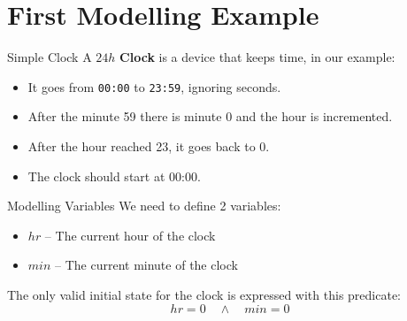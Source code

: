 \section[image=bgphoto_cut]{First Modelling Example}
\begin{frame}[plain]{}
    \sectionpage
\end{frame}

\begin{frame}{Simple Clock}
    A $24h$ \textbf{Clock} is a device that keeps time, in our example:
    \begin{itemize}
        \item<1-> It goes from \texttt{00:00} to \texttt{23:59}, ignoring seconds.
        \item<2-> After the minute 59 there is minute 0 and the hour is incremented.
        \item<2-> After the hour reached 23, it goes back to 0.
        \item<3-> The clock should start at 00:00.
    \end{itemize}
\end{frame}

\begin{frame}{Modelling Variables}
    We need to define 2 variables:
    \begin{itemize}[<+->]
        \item $hr$ -- The current hour of the clock
        \item $min$ -- The current minute of the clock\demo
    \end{itemize}
    \onslide<+->
    \vspace{1cm}
    The only valid initial state for the clock is expressed with this predicate:
    \[
        hr = 0 \quad \land \quad min = 0
    \]
    \demo
\end{frame}

